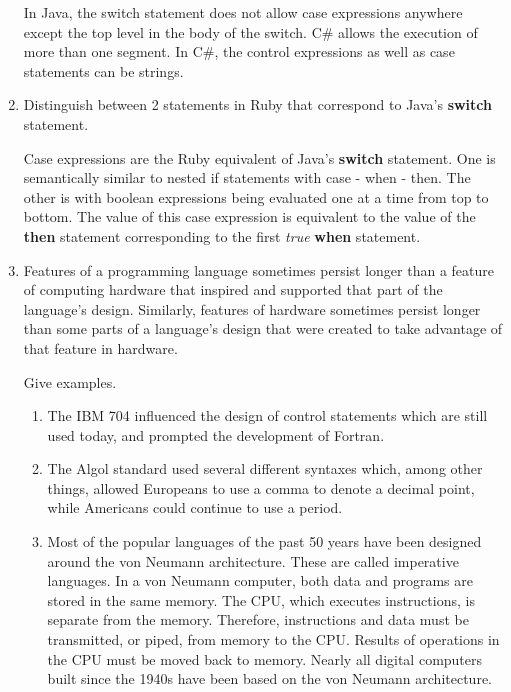 \begin{enumerate}
\begin{answer}
    In Java, the switch statement does not allow case
    expressions anywhere except the top level in the body
    of the switch.  C\#  allows the execution of more than
    one segment. In C\#, the control expressions as well as
    case statements can be strings.

  \end{answer}

  \item Distinguish between 2 statements in Ruby
    that correspond to Java's \textbf{switch} statement.

  \begin{answer}

    Case expressions are the Ruby equivalent of Java's \textbf{switch}
    statement. One is semantically similar to nested if
    statements with case - when - then. The other is with
    boolean expressions being evaluated one at a time from top
    to bottom. The value of this case expression is equivalent
    to the value of the \textbf{then} statement corresponding to the
    first \textit{true} \textbf{when} statement.

  \end{answer}

  \item Features of a programming language sometimes persist
    longer than a feature of computing hardware that inspired
    and supported that part of the language's design.
    Similarly, features of hardware sometimes persist longer
    than some parts of a language's design that were created
    to take advantage of that feature in hardware.

    Give examples.

  \begin{answer}

    \begin{enumerate}
      \item The IBM 704 influenced the design of control statements
      which are still used today, and prompted the development
      of Fortran.
      \item The Algol standard used several different syntaxes which,
      among other things, allowed Europeans to use a comma to
      denote a decimal point, while Americans could continue to
      use a period.
      \item Most of the popular languages of the past 50 years have
      been designed around the von Neumann architecture. These
      are called imperative languages. In a von Neumann computer,
      both data and programs are stored in the same memory. The
      CPU, which executes instructions, is separate from the
      memory. Therefore, instructions and data must be
      transmitted, or piped, from memory to the CPU. Results of
      operations in the CPU must be moved back to memory. Nearly
      all digital computers built since the 1940s have been based
      on the von Neumann architecture.
    \end{enumerate}


\end{answer}
\end{enumerate}
